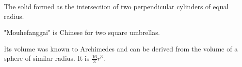 The solid formed as the intersection of two perpendicular cylinders of equal radius.
\par
"Mouhefanggai" is Chinese for two square umbrellas.
\par
Its volume was known to Archimedes and can be derived from the volume of a sphere of similar radius. It is $\frac{16}{3}r^3$. 
